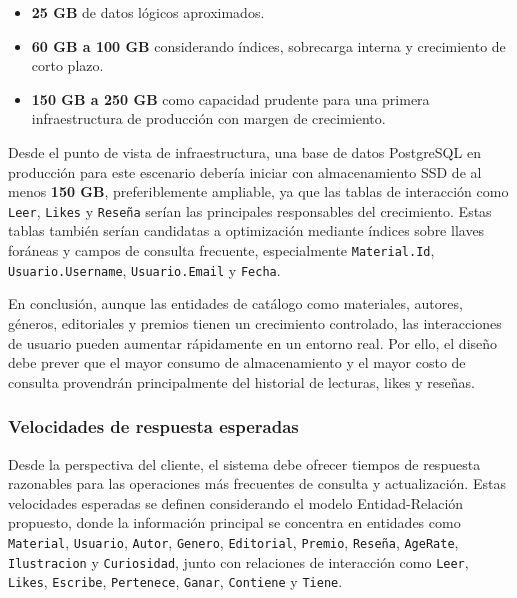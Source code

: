 \documentclass[12pt,a4paper]{article}
\begin{document}
\begin{itemize}
    \item \textbf{25 GB} de datos lógicos aproximados.
    \item \textbf{60 GB a 100 GB} considerando índices, sobrecarga interna y crecimiento de corto plazo.
    \item \textbf{150 GB a 250 GB} como capacidad prudente para una primera infraestructura de producción con margen de crecimiento.
\end{itemize}

Desde el punto de vista de infraestructura, una base de datos PostgreSQL en producción para este escenario debería iniciar con almacenamiento SSD de al menos \textbf{150 GB}, preferiblemente ampliable, ya que las tablas de interacción como \texttt{Leer}, \texttt{Likes} y \texttt{Reseña} serían las principales responsables del crecimiento. Estas tablas también serían candidatas a optimización mediante índices sobre llaves foráneas y campos de consulta frecuente, especialmente \texttt{Material.Id}, \texttt{Usuario.Username}, \texttt{Usuario.Email} y \texttt{Fecha}.

En conclusión, aunque las entidades de catálogo como materiales, autores, géneros, editoriales y premios tienen un crecimiento controlado, las interacciones de usuario pueden aumentar rápidamente en un entorno real. Por ello, el diseño debe prever que el mayor consumo de almacenamiento y el mayor costo de consulta provendrán principalmente del historial de lecturas, likes y reseñas.

\subsubsection{Velocidades de respuesta esperadas}

Desde la perspectiva del cliente, el sistema debe ofrecer tiempos de respuesta razonables para las operaciones más frecuentes de consulta y actualización. Estas velocidades esperadas se definen considerando el modelo Entidad-Relación propuesto, donde la información principal se concentra en entidades como \texttt{Material}, \texttt{Usuario}, \texttt{Autor}, \texttt{Genero}, \texttt{Editorial}, \texttt{Premio}, \texttt{Reseña}, \texttt{AgeRate}, \texttt{Ilustracion} y \texttt{Curiosidad}, junto con relaciones de interacción como \texttt{Leer}, \texttt{Likes}, \texttt{Escribe}, \texttt{Pertenece}, \texttt{Ganar}, \texttt{Contiene} y \texttt{Tiene}.
\end{document}
